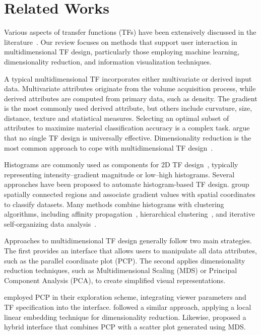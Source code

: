 \section{Related Works}
\label{sect:related-works}

Various aspects of transfer functions (TFs) have been extensively discussed in the literature~\cite{ljung2016}. Our review focuses on methods that support user interaction in multidimensional TF design, particularly those employing machine learning, dimensionality reduction, and information visualization techniques.

A typical multidimensional TF incorporates either multivariate or derived input data. Multivariate attributes originate from the volume acquisition process, while derived attributes are computed from primary data, such as density. The gradient is the most commonly used derived attribute, but others include curvature, size, distance, texture and statistical measures. Selecting an optimal subset of attributes to maximize material classification accuracy is a complex task. \citet{arens2010} argue that no single TF design is universally effective. Dimensionality reduction is the most common approach to cope with multidimensional TF design~\cite{cai2017, abbasloo2016, gao2022, moura2007, zhao2010}.

Histograms are commonly used as components for 2D TF design~\cite{kniss2002}, typically representing intensity--gradient magnitude or low--high histograms. Several approaches have been proposed to automate histogram-based TF design. \cite{troettger2005} group spatially connected regions and associate gradient values with spatial coordinates to classify datasets. Many methods combine histograms with clustering algorithms, including affinity propagation~\cite{zhang2016}, hierarchical clustering~\cite{sereda2006}, and iterative self-organizing data analysis~\cite{tzeng2004}.

Approaches to multidimensional TF design generally follow two main strategies. The first provides an interface that allows users to manipulate all data attributes, such as the parallel coordinate plot (PCP). The second applies dimensionality reduction techniques, such as Multidimensional Scaling (MDS) or Principal Component Analysis (PCA), to create simplified visual representations.

\citet{tory2005} employed PCP in their exploration scheme, integrating viewer parameters and TF specification into the interface. \citet{zhao2010} followed a similar approach, applying a local linear embedding technique for dimensionality reduction. Likewise, \citet{guo2011} proposed a hybrid interface that combines PCP with a scatter plot generated using MDS.

